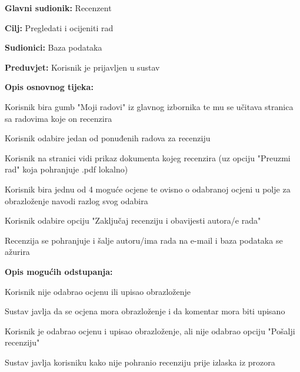 				
					\noindent {}
					\begin{packed_item}
						
						\item \textbf{Glavni sudionik:} Recenzent
						\item \textbf{Cilj:} Pregledati i ocijeniti rad
						\item \textbf{Sudionici:} Baza podataka
						\item \textbf{Preduvjet:} Korisnik je prijavljen u sustav
						\item \textbf{Opis osnovnog tijeka:} 
						
						\item[] \begin{packed_enum}
							\item Korisnik bira gumb "Moji radovi" iz glavnog izbornika te mu se učitava stranica sa radovima koje on recenzira
							\item Korisnik odabire jedan od ponuđenih radova za recenziju
							\item  Korisnik na stranici vidi prikaz dokumenta kojeg recenzira (uz opciju "Preuzmi rad" koja pohranjuje .pdf lokalno)
							\item Korisnik bira jednu od 4 moguće ocjene te ovisno o odabranoj ocjeni u polje za obrazloženje navodi razlog svog odabira
							\item Korisnik odabire opciju "Zaključaj recenziju i obavijesti autora/e rada"
							\item Recenzija se pohranjuje i šalje autoru/ima rada na e-mail i baza podataka se ažurira
						\end{packed_enum}
					
						\item \textbf{Opis mogućih odstupanja:}
						
						\item[] \begin{packed_enum}
							\item[3.a] Korisnik nije odabrao ocjenu ili upisao obrazloženje
							\item[] \begin{packed_enum}
								\item[1.] Sustav javlja da se ocjena mora obrazloženje i da komentar mora biti upisano
							\end{packed_enum}
							\item[3.b] Korisnik je odabrao ocjenu i upisao obrazloženje, ali nije odabrao opciju "Pošalji recenziju"
							\item[] \begin{packed_enum}
								\item[1.] Sustav javlja korisniku kako nije pohranio recenziju prije izlaska iz prozora
							\end{packed_enum}
						\end{packed_enum}
					
					\end{packed_item}
				
